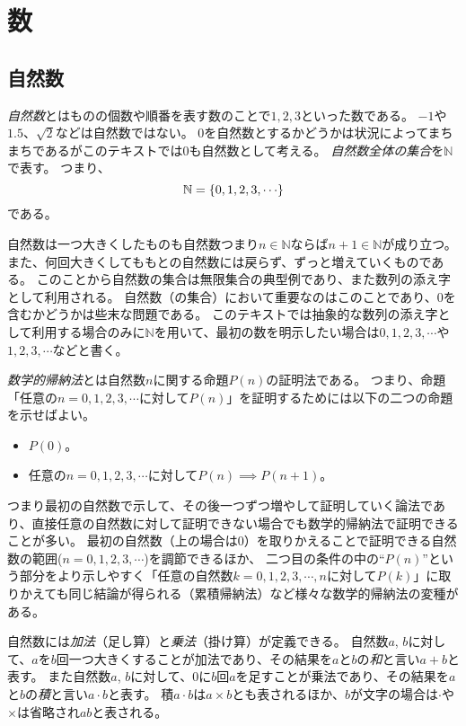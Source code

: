 
\chapter{数}

\section{自然数}

\emph{自然数}とはものの個数や順番を表す数のことで$1, 2, 3$といった数である。
$-1$や$1.5$、$\sqrt{2}$などは自然数ではない。
$0$を自然数とするかどうかは状況によってまちまちであるがこのテキストでは$0$も自然数として考える。
\emph{自然数全体の集合}を$\mathbb{N}$で表す。
つまり、
$$
\mathbb{N} = \lrset{ 0, 1, 2, 3, \cdots }
$$
である。

自然数は一つ大きくしたものも自然数つまり$n \in \mathbb{N}$ならば$n+1 \in \mathbb{N}$が成り立つ。
また、何回大きくしてももとの自然数には戻らず、ずっと増えていくものである。
このことから自然数の集合は無限集合の典型例であり、また数列の添え字として利用される。
自然数（の集合）において重要なのはこのことであり、$0$を含むかどうかは些末な問題である。
このテキストでは抽象的な数列の添え字として利用する場合のみに$\mathbb{N}$を用いて、最初の数を明示したい場合は$0, 1, 2, 3, \cdots$や$1, 2, 3, \cdots$などと書く。

\emph{数学的帰納法}とは自然数$n$に関する命題$P(n)$の証明法である。
つまり、命題「任意の$n = 0, 1, 2, 3, \cdots$に対して$P(n)$」を証明するためには以下の二つの命題を示せばよい。
\begin{itemize}
\item
$P(0)$。
\item
任意の$n = 0, 1, 2, 3, \cdots$に対して$P(n) \implies P(n+1)$。
\end{itemize}
つまり最初の自然数で示して、その後一つずつ増やして証明していく論法であり、直接任意の自然数に対して証明できない場合でも数学的帰納法で証明できることが多い。
最初の自然数（上の場合は$0$）を取りかえることで証明できる自然数の範囲($n = 0, 1, 2, 3, \cdots$)を調節できるほか、
二つ目の条件の中の``$P(n)$''という部分をより示しやすく「任意の自然数$k = 0, 1, 2, 3, \cdots, n$に対して$P(k)$」に取りかえても同じ結論が得られる（累積帰納法）など様々な数学的帰納法の変種がある。

自然数には\emph{加法}（足し算）と\emph{乗法}（掛け算）が定義できる。
自然数$a$, $b$に対して、$a$を$b$回一つ大きくすることが加法であり、その結果を$a$と$b$の\emph{和}と言い$a+b$と表す。
また自然数$a$, $b$に対して、$0$に$b$回$a$を足すことが乗法であり、その結果を$a$と$b$の\emph{積}と言い$a\cdot b$と表す。
積$a\cdot b$は$a\times b$とも表されるほか、$b$が文字の場合は$\cdot$や$\times$は省略され$a b$と表される。

